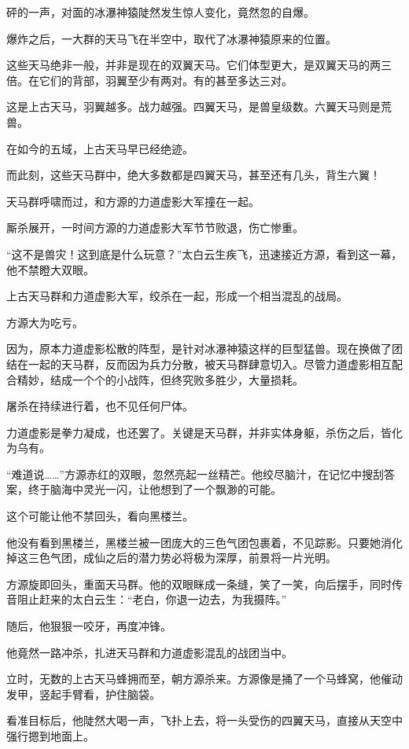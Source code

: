 \begin{this_body}
砰的一声，对面的冰瀑神猿陡然发生惊人变化，竟然忽的自爆。

爆炸之后，一大群的天马飞在半空中，取代了冰瀑神猿原来的位置。

这些天马绝非一般，并非是现在的双翼天马。它们体型更大，是双翼天马的两三倍。在它们的背部，羽翼至少有两对。有的甚至多达三对。

这是上古天马，羽翼越多。战力越强。四翼天马，是兽皇级数。六翼天马则是荒兽。

在如今的五域，上古天马早已经绝迹。

而此刻，这些天马群中，绝大多数都是四翼天马，甚至还有几头，背生六翼！

天马群呼啸而过，和方源的力道虚影大军撞在一起。

厮杀展开，一时间方源的力道虚影大军节节败退，伤亡惨重。

“这不是兽灾！这到底是什么玩意？”太白云生疾飞，迅速接近方源，看到这一幕，他不禁瞪大双眼。

上古天马群和力道虚影大军，绞杀在一起，形成一个相当混乱的战局。

方源大为吃亏。

因为，原本力道虚影松散的阵型，是针对冰瀑神猿这样的巨型猛兽。现在换做了团结在一起的天马群，反而因为兵力分散，被天马群肆意切入。尽管力道虚影相互配合精妙，结成一个个的小战阵，但终究败多胜少，大量损耗。

屠杀在持续进行着，也不见任何尸体。

力道虚影是拳力凝成，也还罢了。关键是天马群，并非实体身躯，杀伤之后，皆化为乌有。

“难道说……”方源赤红的双眼，忽然亮起一丝精芒。他绞尽脑汁，在记忆中搜刮答案，终于脑海中灵光一闪，让他想到了一个飘渺的可能。

这个可能让他不禁回头，看向黑楼兰。

他没有看到黑楼兰，黑楼兰被一团庞大的三色气团包裹着，不见踪影。只要她消化掉这三色气团，成仙之后的潜力势必将极为深厚，前景将一片光明。

方源旋即回头，重面天马群。他的双眼眯成一条缝，笑了一笑，向后摆手，同时传音阻止赶来的太白云生：“老白，你退一边去，为我摄阵。”

随后，他狠狠一咬牙，再度冲锋。

他竟然一路冲杀，扎进天马群和力道虚影混乱的战团当中。

立时，无数的上古天马蜂拥而至，朝方源杀来。方源像是捅了一个马蜂窝，他催动发甲，竖起手臂看，护住脑袋。

看准目标后，他陡然大喝一声，飞扑上去，将一头受伤的四翼天马，直接从天空中强行摁到地面上。


\end{this_body}
